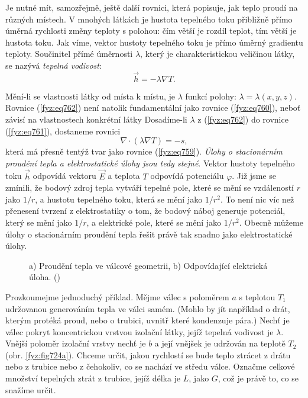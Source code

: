     Je nutné mít, samozřejmě, ještě další rovnici, která popisuje, jak teplo proudí na různých
    místech. V mnohých látkách je hustota tepelného toku přibližně přímo úměrná rychlosti změny
    teploty s polohou: čím větší je rozdíl teplot, tím větší je hustota toku. Jak víme, vektor
    hustoty tepelného toku je přímo úměrný gradientu teploty. Součinitel přímé úměrnosti
    \(\lambda\), který je charakteristickou veličinou látky, se nazývá \emph{tepelná vodivost}:
    \begin{equation}\label{fyz:eq762}
      \vec{h} = -\lambda\nabla T.
    \end{equation}

    Mění-li se vlastnosti látky od místa k místu, je \(\lambda\) funkcí polohy: \(\lambda =
    \lambda(x,y,z)\). Rovnice (\ref{fyz:eq762}) není natolik fundamentální jako rovnice
    (\ref{fyz:eq760}), neboť závisí na vlastnostech konkrétní látky Dosadíme-li \(\lambda\) z
    (\ref{fyz:eq762}) do rovnice (\ref{fyz:eq761}), dostaneme rovnici
    \begin{equation}\label{fyz:eq763}
      \nabla\cdot(\lambda\nabla T)= - s,
    \end{equation}
    která má přesně tentýž tvar jako rovnice (\ref{fyz:eq759}). \emph{Úlohy o stacionárním proudění
    tepla a elektrostatické úlohy jsou tedy stejné}. Vektor hustoty tepelného toku \(\vec{h}\)
    odpovídá vektoru \(\vec{E}\) a teplota \(T\) odpovídá potenciálu \(\varphi\). Již jsme se
    zmínili, že bodový zdroj tepla vytváří tepelné pole, které se mění se vzdáleností \(r\) jako
    \(1/r\), a hustotu tepelného toku, která se mění jako \(1/r^2\). To není nic víc než přenesení
    tvrzení z elektrostatiky o tom, že bodový náboj generuje potenciál, který se mění jako \(1/r\),
    a elektrické pole, které se mění jako \(1/r^2\). Obecně můžeme úlohy o stacionárním proudění
    tepla řešit právě tak snadno jako elektrostatické úlohy.

    \begin{figure}[ht!]  %
      \centering
      \caption{a) Proudění tepla ve válcové geometrii, b) Odpovídající elektrická úloha. 
        (\cite[s.~206]{Feynman02})}
      \label{fyz:fig724}
    \end{figure}

    Prozkoumejme jednoduchý příklad. Mějme válec s poloměrem \(a\) s teplotou \(T_1\) udržovanou
    generováním tepla ve válci samém. (Mohlo by jít například o drát, kterým protéká proud, nebo o
    trubici, uvnitř které kondenzuje pára.) Nechť je válec pokryt koncentrickou vrstvou izolační
    látky, jejíž tepelná vodivost je \(\lambda\). Vnější poloměr izolační vrstvy nechť je \(b\) a
    její vnějšek je udržován na teplotě \(T_2\) (obr. \ref{fyz:fig724a}). Chceme určit, jakou
    rychlostí se bude teplo ztrácet z drátu nebo z trubice nebo z čehokoliv, co se nachází ve středu
    válce. Označme celkové množství tepelných ztrát z trubice, jejíž délka je \(L\), jako \(G\),
    což je právě to, co se snažíme určit.

